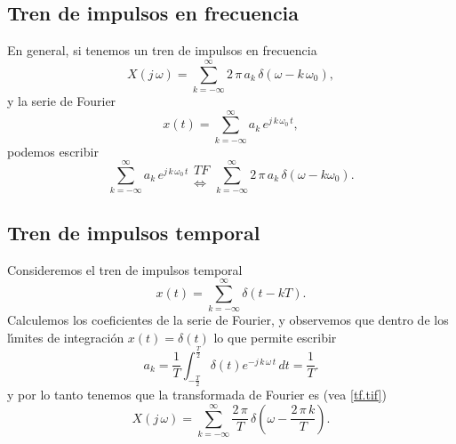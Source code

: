 \subsection{Tren de impulsos en frecuencia}

En general, si tenemos un tren de impulsos en frecuencia
\begin{equation}
        X\left( j \, \omega \right) =
                \sum_{k=-\infty }^{\infty }2 \, \pi \, a_{k} \, \delta \left(\omega -k \, \omega_{0}\right) ,
\end{equation}
y la serie de Fourier
\begin{equation}
        x\left( t\right) =\sum_{k=-\infty }^{\infty }a_{k} \, e^{j \, k \, \omega_{0} \, t},
\end{equation}
podemos escribir 
\begin{equation}
        \sum_{k=-\infty }^{\infty }a_{k} \, e^{j \, k \, \omega_{0} \, t} 
        \begin{array}{c}
                TF \\ 
                \Leftrightarrow
        \end{array}
        \sum_{k=-\infty }^{\infty }2 \, \pi \, a_{k} \, \delta \left( \omega -k \omega_{0} \right). \label{tf.tif}
\end{equation}

\subsection{Tren de impulsos temporal}

Consideremos el tren de impulsos temporal
\begin{equation}
        x\left( t\right) =\sum_{k=-\infty }^{\infty }\delta \left( t-kT\right) .
\end{equation}
Calculemos los coeficientes de la serie de Fourier, y observemos que dentro de los l\'{\i}mites de 
integraci\'{o}n $x\left( t\right) = \delta \left(t\right) $ lo que permite escribir 
\begin{equation}
        a_{k}=
        \frac{1}{T}\int_{-\frac{T}{2}}^{\frac{T}{2}}\delta \left( t\right)e^{-j \, k \, \omega \, t} \, dt=\frac{1}{T}.
\end{equation}
y por lo tanto tenemos que la transformada de Fourier es (vea \ref{tf.tif})
\begin{equation}
        X\left( j \, \omega \right) =
                \sum_{k=-\infty }^{\infty }\frac{2 \, \pi}{T} \, \delta\left( \omega -\frac{2 \, \pi \, k}{T}\right).
\end{equation}


